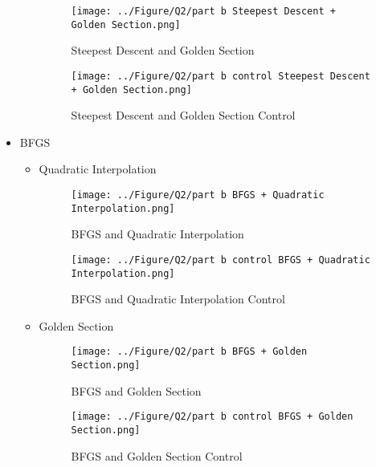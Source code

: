 \begin{itemize}
\begin{itemize}
		\begin{figure}[H]
			\caption{Steepest Descent and Golden Section}
			\centering
			\texttt{[image: ../Figure/Q2/part b Steepest Descent + Golden Section.png]}
		\end{figure}
		\begin{figure}[H]
			\caption{Steepest Descent and Golden Section Control}
			\centering
			\texttt{[image: ../Figure/Q2/part b control Steepest Descent + Golden Section.png]}
		\end{figure}
	\end{itemize}
\newpage
	\item BFGS
	\begin{itemize}
		\item Quadratic Interpolation
		\begin{figure}[H]
			\caption{BFGS and Quadratic Interpolation}
			\centering
			\texttt{[image: ../Figure/Q2/part b BFGS + Quadratic Interpolation.png]}
		\end{figure}
			\begin{figure}[H]
		\caption{BFGS and Quadratic Interpolation Control}
		\centering
		\texttt{[image: ../Figure/Q2/part b control BFGS + Quadratic Interpolation.png]}
	\end{figure}
\newpage
		\item Golden Section
		\begin{figure}[H]
			\caption{BFGS and Golden Section}
			\centering
			\texttt{[image: ../Figure/Q2/part b BFGS + Golden Section.png]}
		\end{figure}
			\begin{figure}[H]
		\caption{BFGS and Golden Section Control}
		\centering
		\texttt{[image: ../Figure/Q2/part b control BFGS + Golden Section.png]}
	\end{figure}
	\end{itemize}
\end{itemize}
\newpage
